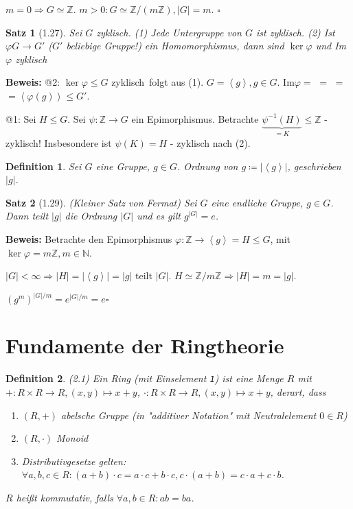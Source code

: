 \documentclass[10pt,a4paper]{article}
\newtheorem{defi}{Definition}
\newtheorem{satz}{Satz}
\begin{document}
$m=0 \Rightarrow G \simeq \mathbb{Z}$. $m > 0: G \simeq
\mathbb{Z} / (m \mathbb{Z}), \vert G \vert = m$. $\square$

\begin{satz}[1.27]
Sei $G$ zyklisch. (1) Jede Untergruppe von $G$ ist zyklisch. (2) Ist $\varphi G \to G'$ ($G'$ beliebige Gruppe!) ein Homomorphismus, dann sind $\ker \varphi$ und Im$\varphi$ zyklisch
\end{satz}
\textbf{Beweis:} @2: \glqq $\ker\varphi \leqslant G$ zyklisch\grqq\ folgt aus (1). $G = \left< g \right>, g \in G$. Im$\varphi =$   $=$  $=$  $= \left< \varphi(g) \right> \leqslant G'$.

@1: Sei $H \leq G$. Sei $\psi : \mathbb{Z} \to G$ ein Epimorphismus. Betrachte $\underbrace{\psi^{-1}(H)}_{= K} \leqslant \mathbb{Z}$ - zyklisch! Insbesondere ist $\psi(K) = H$ - zyklisch nach (2).

\begin{defi}
Sei $G$ eine Gruppe, $g \in G$. Ordnung von $g \coloneqq \vert \left< g \right> \vert$, geschrieben $\vert g \vert$.
\end{defi}

\begin{satz}[1.29](Kleiner Satz von Fermat)
Sei $G$ eine endliche Gruppe, $g \in G$. Dann teilt $\vert g \vert$ die Ordnung $\vert G \vert$ und es gilt $g^{\vert G \vert} = e$.
\end{satz}
\textbf{Beweis:} Betrachte den Epimorphismus $\varphi: \mathbb{Z} \to \left< g \right> = H \leqslant G$, mit $\ker \varphi = m \mathbb{Z}, m \in \mathbb{N}$.

$\vert G \vert < \infty \Rightarrow \vert H \vert = \vert \left< g \right> \vert = \vert g \vert$ teilt $\vert G \vert$. $H \simeq \mathbb{Z} / m\mathbb{Z} \Rightarrow \vert H \vert = m = \vert g \vert.$

$(g^m)^{\vert G \vert / m} = e^{\vert G \vert / m} = e \square$\bigskip

\section{Fundamente der Ringtheorie}

\begin{defi}(2.1)
Ein \emph{Ring} (mit Einselement \texttt{1}) ist eine Menge $R$ mit $+ : R \times R \to R, (x,y) \mapsto x + y$, $\cdot : R \times R \to R, (x,y) \mapsto x + y$, derart, dass
\begin{enumerate}
\item $(R,+)$ abelsche Gruppe (in "additiver Notation" mit Neutralelement $0 \in R$)
\item $(R, \cdot)$ Monoid
\item Distributivgesetze gelten: $\forall a,b,c \in R: (a+b) \cdot c = a  \cdot c + b \cdot c, c \cdot (a+b) = c \cdot a + c \cdot b$.
\end{enumerate}
$R$ heißt \emph{kommutativ}, falls $\forall a,b \in R: ab = ba$.
\end{defi}
\end{document}

